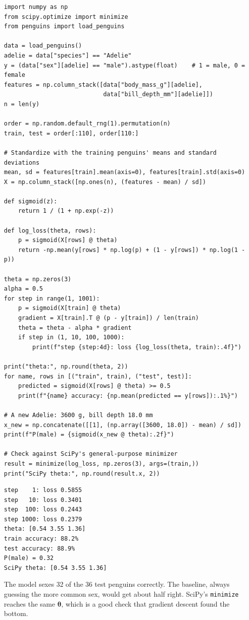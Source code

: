 \begin{verbatim}
import numpy as np
from scipy.optimize import minimize
from penguins import load_penguins

data = load_penguins()
adelie = data["species"] == "Adelie"
y = (data["sex"][adelie] == "male").astype(float)    # 1 = male, 0 = female
features = np.column_stack([data["body_mass_g"][adelie],
                            data["bill_depth_mm"][adelie]])
n = len(y)

order = np.random.default_rng(1).permutation(n)
train, test = order[:110], order[110:]

# Standardize with the training penguins' means and standard deviations
mean, sd = features[train].mean(axis=0), features[train].std(axis=0)
X = np.column_stack([np.ones(n), (features - mean) / sd])

def sigmoid(z):
    return 1 / (1 + np.exp(-z))

def log_loss(theta, rows):
    p = sigmoid(X[rows] @ theta)
    return -np.mean(y[rows] * np.log(p) + (1 - y[rows]) * np.log(1 - p))

theta = np.zeros(3)
alpha = 0.5
for step in range(1, 1001):
    p = sigmoid(X[train] @ theta)
    gradient = X[train].T @ (p - y[train]) / len(train)
    theta = theta - alpha * gradient
    if step in (1, 10, 100, 1000):
        print(f"step {step:4d}: loss {log_loss(theta, train):.4f}")

print("theta:", np.round(theta, 2))
for name, rows in [("train", train), ("test", test)]:
    predicted = sigmoid(X[rows] @ theta) >= 0.5
    print(f"{name} accuracy: {np.mean(predicted == y[rows]):.1%}")

# A new Adelie: 3600 g, bill depth 18.0 mm
x_new = np.concatenate([[1], (np.array([3600, 18.0]) - mean) / sd])
print(f"P(male) = {sigmoid(x_new @ theta):.2f}")

# Check against SciPy's general-purpose minimizer
result = minimize(log_loss, np.zeros(3), args=(train,))
print("SciPy theta:", np.round(result.x, 2))
\end{verbatim}

\begin{verbatim}
step    1: loss 0.5855
step   10: loss 0.3401
step  100: loss 0.2443
step 1000: loss 0.2379
theta: [0.54 3.55 1.36]
train accuracy: 88.2%
test accuracy: 88.9%
P(male) = 0.32
SciPy theta: [0.54 3.55 1.36]
\end{verbatim}

The model sexes 32 of the 36 test penguins correctly. The baseline, always guessing the more common sex, would
get about half right. SciPy's \verb|minimize| reaches the same $\boldsymbol{\theta}$, which is a good check
that gradient descent found the bottom.

